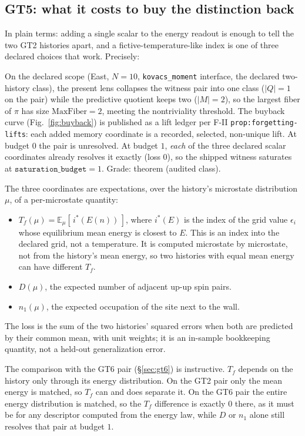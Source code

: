 \subsection{GT5: what it costs to buy the distinction back}

In plain terms: adding a single scalar to the energy readout is enough to tell the two GT2
histories apart, and a fictive-temperature-like index is one of three declared choices that work.
Precisely:

On the declared scope (East, $N=10$, \texttt{kovacs\_moment} interface, the declared two-history
class), the present lens collapses the witness pair into one class ($|Q| = 1$ on the pair) while
the predictive quotient keeps two ($|M| = 2$), so the largest fiber of $\pi$ has size
$\mathrm{MaxFiber} = 2$, meeting the nontriviality threshold. The buyback curve
(Fig.~\ref{fig:buyback}) is published as a lift ledger per F-II \texttt{prop:forgetting-lifts}:
each added memory coordinate is a recorded, selected, non-unique lift. At budget $0$ the pair is
unresolved. At budget $1$, \emph{each} of the three declared scalar coordinates already resolves
it exactly (loss $0$), so the shipped witness saturates at $\texttt{saturation\_budget} = 1$.
Grade: theorem (audited class).

The three coordinates are expectations, over the history's microstate distribution $\mu$, of a
per-microstate quantity:
\begin{itemize}
  \item $T_f(\mu) = \mathbb{E}_\mu[\,i^*(E(n))\,]$, where $i^*(E)$ is the index of the grid value
    $\epsilon_i$ whose equilibrium mean energy is closest to $E$. This is an index into the
    declared grid, not a temperature. It is computed microstate by microstate, not from the
    history's mean energy, so two histories with equal mean energy can have different $T_f$.
  \item $D(\mu)$, the expected number of adjacent up-up spin pairs.
  \item $n_1(\mu)$, the expected occupation of the site next to the wall.
\end{itemize}
The loss is the sum of the two histories' squared errors when both are predicted by their common
mean, with unit weights; it is an in-sample bookkeeping quantity, not a held-out generalization
error.

The comparison with the GT6 pair (\S\ref{sec:gt6}) is instructive. $T_f$ depends on the history
only through its energy distribution. On the GT2 pair only the mean energy is matched, so $T_f$
can and does separate it. On the GT6 pair the entire energy distribution is matched, so the $T_f$
difference is exactly $0$ there, as it must be for any descriptor computed from the energy law,
while $D$ or $n_1$ alone still resolves that pair at budget $1$.

